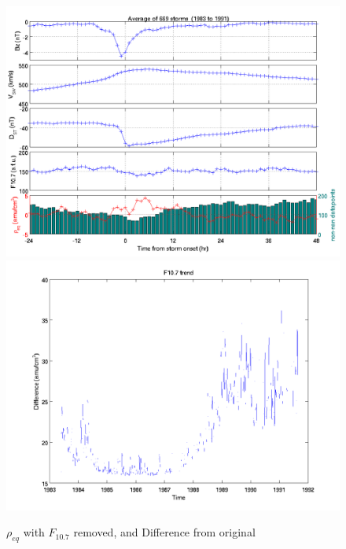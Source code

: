 \documentclass[10pt,twocolumn]{article}
\begin{document}
\begin{figure}[htp!]
\centering
\includegraphics[scale=0.35]{paperfigures/stormavs-dst-nof107.png}
\includegraphics[scale=0.35]{paperfigures/f107removed.png}
\caption{$\rho_{eq}$ with $F_{10.7}$ removed, and Difference from original}
\label{nof107}
\end{figure}

\newpage
\footnotesize



\end{document}
